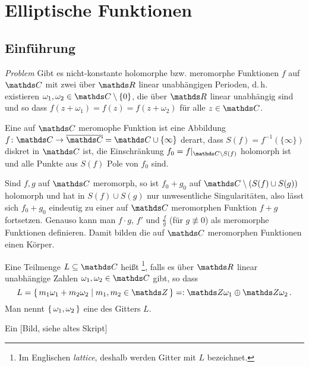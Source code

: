 \section{Elliptische Funktionen}

\subsection{Einführung}

\emph{Problem} Gibt es nicht-konstante holomorphe bzw. meromorphe Funktionen $f$ auf $\CC$ mit zwei über $\RR$ linear unabhängigen Perioden, d.\,h. existieren $\omega_1, \omega_2 \in \CC\setminus\{0\}$, die über $\RR$ linear unabhängig sind und so dass $f(z+\omega_1) = f(z) = f(z+\omega_2)$ für alle $z\in\CC$.

\begin{erin*}
Eine auf $\CC$ meromophe Funktion ist eine Abbildung $f\colon \CC \ra \closure \CC = \CC \cup \{\infty\}$ derart, dass $S(f) = f^{-1}(\{\infty\})$ diskret in $\CC$ ist, die Einschränkung $f_0 = f|_{\CC\setminus S(f)}$ holomorph ist und alle Punkte aus $S(f)$ Pole von $f_0$ sind.

Sind $f, g$ auf $\CC$ meromorph, so ist $f_0 + g_0$ auf $\CC\setminus(S(f) \cup S(g))$ holomorph und hat in $S(f) \cup S(g)$ nur unwesentliche Singularitäten, also lässt sich $f_0 + g_0$ eindeutig zu einer auf $\CC$ meromorphen Funktion $f+g$ fortsetzen.
Genauso kann man $f\cdot g$, $f'$ und $\frac{f}{g}$ (für $g\not\equiv 0$) als meromorphe Funktionen definieren. Damit bilden die auf $\CC$ meromorphen Funktionen einen Körper.
\end{erin*}

\begin{defi}
Eine Teilmenge $L \subseteq \CC$ heißt \footnote{Im Englischen \emph{lattice}, deshalb werden Gitter mit $L$ bezeichnet.}, falls es über $\RR$ linear unabhängige Zahlen $\omega_1, \omega_2\in\CC$ gibt, so dass
\[
	L = \Set{ m_1\omega_1 + m_2 \omega_2 \mid m_1, m_2 \in \ZZ}
	=: \ZZ\omega_1 \oplus \ZZ\omega_2
	\,.
\]
Man nennt $\left\{\,\omega_1, \omega_2\,\right\}$ eine  des Gitters $L$.
\end{defi}

\begin{bsp}
Ein [Bild, siehe altes Skript]
\end{bsp}


